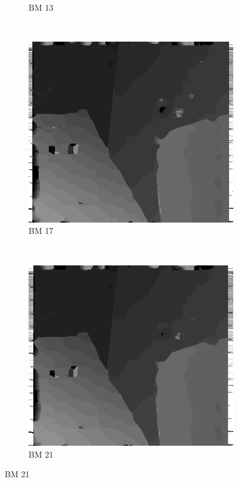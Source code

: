 \begin{figure}
\begin{subfigure}[b]{0.23\textwidth}
    \caption{BM 13}
  \end{subfigure}
  ~
  \begin{subfigure}[b]{0.23\textwidth}
    \centering
    \includegraphics[width=\textwidth]{images/stereo-pairs/venus_bm_17.png}
    \caption{BM 17}
  \end{subfigure}
  ~
  \begin{subfigure}[b]{0.23\textwidth}
    \centering
    \includegraphics[width=\textwidth]{images/stereo-pairs/venus_bm_21.png}
    \caption{BM 21}
  \end{subfigure}


\end{figure}
